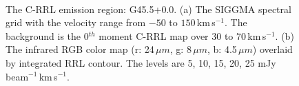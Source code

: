 \documentclass[manuscript]{aastex61}
\newcommand{\kms}{\,km\,s$^{-1}$}
\newcommand{\um}{\mu m}
\begin{document}
\begin{figure}[H]
\centering
{}
\\ 
\caption{The C-RRL emission region: G45.5+0.0.
          (a) The SIGGMA spectral grid with the velocity range from $-50$ to $150$\kms.
	  The background is the 0$^{th}$ moment C-RRL map over $30$ to $70$\kms.
	  (b) The infrared RGB color map (r: 24\,$\um$, g: 8\,$\um$, b: 4.5\,$\um$) overlaid by integrated RRL contour.
	  The levels are 5, 10, 15, 20, 25 mJy\,beam$^{-1}$\kms.}
\label{fig_crrl-g455}
\end{figure}
\end{document}
